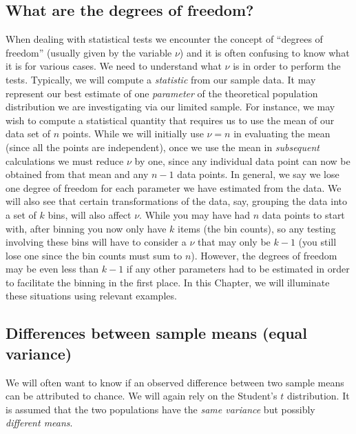 \subsection{What are the degrees of freedom?}
\label{sec:freedom}
When dealing with statistical tests we encounter the concept of ``degrees of freedom'' (usually
given by the variable $\nu$) and it is
often confusing to know what it is for various cases.  We need to understand what $\nu$ is in
order to perform the tests.  Typically, we will compute a \emph{statistic} from our sample data.
It may represent our best estimate of one \emph{parameter} of the theoretical population distribution we are
investigating via our limited sample.  For instance, we may wish to compute a statistical quantity that requires
us to use the mean of our data set of $n$ points.  While we will initially use $\nu = n$ in evaluating the mean
(since all the points are independent), once we use
the mean in \emph{subsequent} calculations we must reduce $\nu$ by one, since any individual data point can
now be obtained from that mean and any $n-1$ data points.  In general, we say we lose one degree of
freedom for each parameter we have estimated from the data.  We will also see that certain transformations
of the data, say, grouping the data into a set of $k$ bins, will also affect $\nu$.  While you may have had
$n$ data points to start with, after binning you now only have $k$ items (the bin counts), so any testing involving these bins
will have to consider a $\nu$ that may only be $k-1$ (you still lose one since the bin counts must sum to $n$).  However,
the degrees of freedom may be even less than $k-1$ if any other parameters had to be estimated in order to
facilitate the binning in the first place.  In this Chapter, we will illuminate these situations using relevant examples.

\subsection{Differences between sample means (equal variance)}
\label{sec:twomeans}
	We will often want to know if an observed difference between two sample means can be attributed to 
chance.  We will again rely on the Student's $t$ distribution.  It is assumed that the two populations
have the \emph{same variance} but possibly \emph{different means}.  

